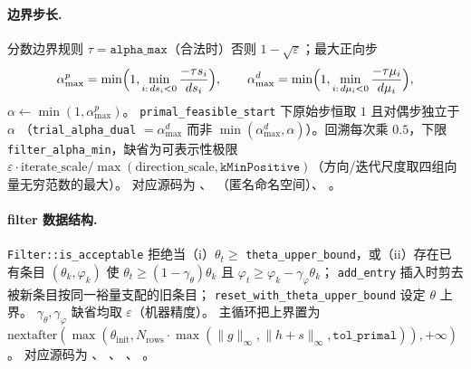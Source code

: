 \paragraph{边界步长.}
分数边界规则 $\tau = \texttt{alpha\_max}$（合法时）否则
$1 - \sqrt{\varepsilon}$；最大正向步
\begin{equation}
  \alpha_{\max}^{p} = \min\Bigl(1, \min_{i:\, d s_i < 0}
  \frac{-\tau s_i}{d s_i}\Bigr),\qquad
  \alpha_{\max}^{d} = \min\Bigl(1, \min_{i:\, d\mu_i < 0}
  \frac{-\tau \mu_i}{d\mu_i}\Bigr),
  \label{eq:ipm:frac-boundary}
\end{equation}
$\alpha \leftarrow \min(1, \alpha_{\max}^{p})$。
\texttt{primal\_feasible\_start} 下原始步恒取 $1$ 且对偶步独立于 $\alpha$
（\texttt{trial\_alpha\_dual} $= \alpha_{\max}^{d}$ 而非
$\min(\alpha_{\max}^{d}, \alpha)$）。回溯每次乘 $0.5$，下限
\texttt{filter\_alpha\_min}，缺省为可表示性极限
$\varepsilon \cdot \mathrm{iterate\_scale} / \max(\mathrm{direction\_scale},
\texttt{kMinPositive})$（方向/迭代尺度取四组向量无穷范数的最大）。
对应源码为 、
（匿名命名空间）、
。

\paragraph{filter 数据结构.}
\texttt{Filter::is\_acceptable} 拒绝当（i）$\theta_t \ge$
\texttt{theta\_upper\_bound}，或（ii）存在已有条目 $(\theta_k, \varphi_k)$
使 $\theta_t \ge (1-\gamma_\theta)\theta_k$ 且
$\varphi_t \ge \varphi_k - \gamma_\varphi \theta_k$；
\texttt{add\_entry} 插入时剪去被新条目按同一裕量支配的旧条目；
\texttt{reset\_with\_theta\_upper\_bound} 设定 $\theta$ 上界。
$\gamma_\theta, \gamma_\varphi$ 缺省均取 $\varepsilon$（机器精度）。
主循环把上界置为
$\mathrm{nextafter}(\max(\theta_{\text{init}}, N_{\text{rows}} \cdot
\max(\|g\|_{\infty}, \|h+s\|_{\infty}, \texttt{tol\_primal})), +\infty)$。
对应源码为 、
、
、
。

